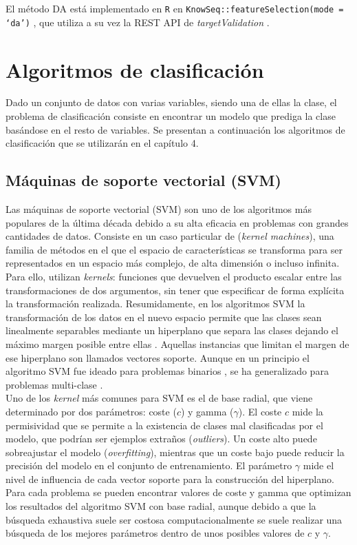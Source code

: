 El método DA  está implementado en \texttt{R}  en \texttt{KnowSeq::featureSelection(mode = `da')} \cite{KnowSeq}, que utiliza a su vez la REST API de \textit{targetValidation} \cite{OpenTargets2020}.

\section{Algoritmos de clasificación}

Dado un conjunto de datos con varias variables, siendo una de ellas la clase, el problema de clasificación consiste en encontrar un modelo que prediga la clase basándose en el resto de variables. Se presentan a continuación los  algoritmos de clasificación que se utilizarán en el capítulo 4.

\subsection{Máquinas de soporte vectorial (SVM)}

Las máquinas de soporte vectorial (SVM) son uno de los algoritmos más populares de la última década debido a su alta eficacia en problemas con grandes cantidades de datos. Consiste en un caso particular de (\textit{kernel machines}), una familia de métodos en el que el espacio de características se transforma para ser representados en un espacio más complejo, de alta dimensión o incluso infinita. Para ello, utilizan \textit{kernels}: funciones que devuelven el producto escalar entre las transformaciones de dos argumentos, sin tener que especificar de forma explícita la transformación realizada. Resumidamente, en los algoritmos SVM la transformación de los datos en el nuevo espacio permite que las clases sean linealmente separables mediante un hiperplano que separa las clases dejando el máximo margen posible entre ellas \cite{Boser1992}. Aquellas instancias que limitan el margen de ese hiperplano son llamados vectores soporte. Aunque en un principio el algoritmo SVM fue ideado para problemas binarios \cite{Boser1992}, se ha generalizado para problemas multi-clase \cite{Duan2005}.\\

Uno de los \textit{kernel} más comunes para SVM es el de base radial, que viene determinado por dos parámetros: coste ($c$) y gamma ($\gamma$). El coste $c$ mide la permisividad que se permite a la existencia de clases mal clasificadas por el modelo, que podrían ser ejemplos extraños (\textit{outliers}). Un coste alto puede sobreajustar el modelo (\textit{overfitting}), mientras que un coste bajo puede reducir la precisión del modelo en el conjunto de entrenamiento. El parámetro $\gamma$ mide el nivel de influencia de cada vector soporte para la construcción del hiperplano. Para cada problema se pueden encontrar valores de coste y gamma que optimizan los resultados del algoritmo SVM con base radial, aunque debido a que la búsqueda exhaustiva suele ser costosa computacionalmente se suele realizar una búsqueda de los mejores parámetros dentro de unos posibles valores de $c$ y $\gamma$.\\

